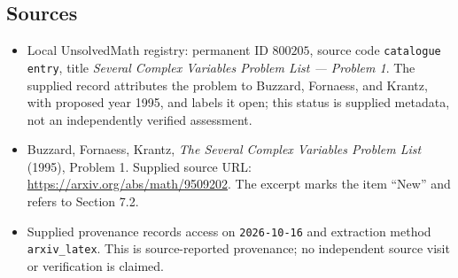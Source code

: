 \documentclass[11pt]{article}
\begin{document}
\subsection{Sources}
\begin{itemize}
\item Local UnsolvedMath registry: permanent ID \(800205\), source code \texttt{catalogue entry}, title \emph{Several Complex Variables Problem List --- Problem 1}. The supplied record attributes the problem to Buzzard, Fornaess, and Krantz, with proposed year 1995, and labels it open; this status is supplied metadata, not an independently verified assessment.
\item Buzzard, Fornaess, Krantz, \emph{The Several Complex Variables Problem List} (1995), Problem 1. Supplied source URL: \url{https://arxiv.org/abs/math/9509202}. The excerpt marks the item ``New'' and refers to Section 7.2.
\item Supplied provenance records access on \texttt{2026-10-16} and extraction method \texttt{arxiv\_latex}. This is source-reported provenance; no independent source visit or verification is claimed.
\end{itemize}
\end{document}
